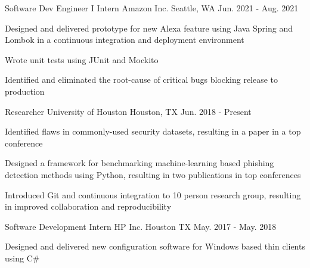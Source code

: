 

\begin{cventries}

  \cventry
    {Software Dev Engineer I Intern} %
    {Amazon Inc.} %
    {Seattle, WA} %
    {Jun. 2021 - Aug. 2021} %
    {
      \begin{cvitems} %
        \item {Designed and delivered prototype for new Alexa feature using Java Spring and Lombok in a continuous integration and deployment environment}
        \item {Wrote unit tests using JUnit and Mockito}
        \item {Identified and eliminated the root-cause of critical bugs blocking release to production}
      \end{cvitems}
    }
  \cventry
    {Researcher} %
    {University of Houston} %
    {Houston, TX} %
    {Jun. 2018 - Present} %
    {
      \begin{cvitems} %
        \item {Identified flaws in commonly-used security datasets, resulting in a paper in a top conference}
        \item {Designed a framework for benchmarking machine-learning based phishing detection methods using Python, resulting in two publications in top conferences}
        \item {Introduced Git and continuous integration to 10 person research group, resulting in improved collaboration and reproducibility}
      \end{cvitems}
    }
  \cventry
    {Software Development Intern} %
    {HP Inc.} %
    {Houston TX} %
    {May. 2017 - May. 2018} %
    {
      \begin{cvitems} %
        \item {Designed and delivered new configuration software for Windows based thin clients using C\#}
      \end{cvitems}
    }
\end{cventries}
